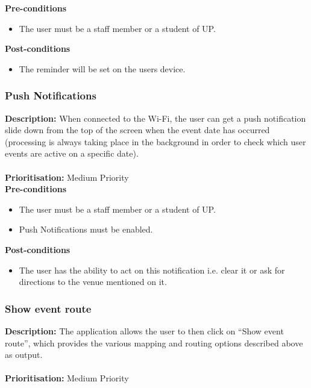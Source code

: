 \documentclass[runningheads,a4paper]{article}
\begin{document}
  
\textbf{Pre-conditions}
\begin{itemize}
	\item The user must be a staff member or a student of UP.
\end{itemize}
  
\textbf{Post-conditions}
\begin{itemize}
  	\item The reminder will be set on the users device.
\end{itemize}

\subsubsection{Push Notifications}

\textbf{Description:} When connected to the Wi-Fi, the user can get a push notification slide down from the top of the screen when the event date has occurred (processing is always taking place in the background in order to check which user events are active on a specific date).\\\\
\noindent
\textbf{Prioritisation:} Medium Priority\\
  
  
\textbf{Pre-conditions}
\begin{itemize}
	\item The user must be a staff member or a student of UP.
	\item Push Notifications must be enabled.
\end{itemize}
  
\textbf{Post-conditions}
\begin{itemize}
  	\item The user has the ability to act on this notification i.e. clear it or ask for directions to the venue mentioned on it.
\end{itemize}

\subsubsection{Show event route}

\textbf{Description:} The application allows the user to then click on “Show event route”, which provides the various mapping and routing options described above as output.\\\\
\noindent
\textbf{Prioritisation:} Medium Priority\\
  
\end{document}
